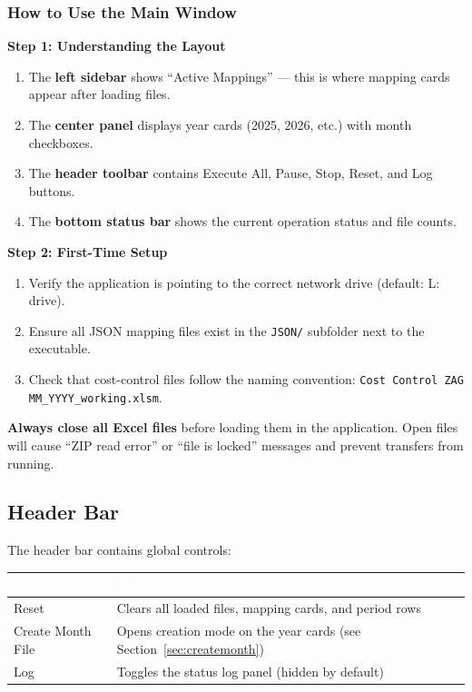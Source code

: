\documentclass[11pt,a4paper]{article}
\begin{document}
\subsubsection{How to Use the Main Window}

\begin{stepbox}
\textbf{Step 1: Understanding the Layout}
\begin{enumerate}[leftmargin=*, itemsep=4pt]
\item The \textbf{left sidebar} shows ``Active Mappings'' --- this is where mapping cards appear after loading files.
\item The \textbf{center panel} displays year cards (2025, 2026, etc.) with month checkboxes.
\item The \textbf{header toolbar} contains Execute All, Pause, Stop, Reset, and Log buttons.
\item The \textbf{bottom status bar} shows the current operation status and file counts.
\end{enumerate}

\textbf{Step 2: First-Time Setup}
\begin{enumerate}[leftmargin=*, itemsep=4pt]
\item Verify the application is pointing to the correct network drive (default: L: drive).
\item Ensure all JSON mapping files exist in the \texttt{JSON/} subfolder next to the executable.
\item Check that cost-control files follow the naming convention: \texttt{Cost Control ZAG MM\_YYYY\_working.xlsm}.
\end{enumerate}
\end{stepbox}

\begin{warningbox}
\textbf{Always close all Excel files} before loading them in the application. Open files will cause ``ZIP read error'' or ``file is locked'' messages and prevent transfers from running.
\end{warningbox}

\subsection{Header Bar}

The header bar contains global controls:

\begin{center}
\begin{tabularx}{0.88\linewidth}{@{} l X @{}}
\toprule
\rowcolor{PrimaryBlue}
\textcolor{White}{\textbf{Button}} & \textcolor{White}{\textbf{Action}} \\
\midrule
Reset          & Clears all loaded files, mapping cards, and period rows \\
Create Month File & Opens creation mode on the year cards (see Section~\ref{sec:createmonth}) \\
Log            & Toggles the status log panel (hidden by default) \\
\bottomrule
\end{tabularx}
\end{center}
\end{document}
